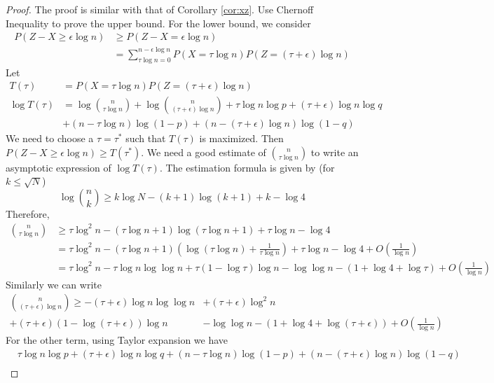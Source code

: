 \documentclass{article}
\begin{document}
\begin{proof}
	The proof is similar with that of Corollary \ref{cor:xz}.
	Use Chernoff Inequality to prove the upper bound. For the lower bound, we consider
	\begin{align*}
	P(Z - X \geq \epsilon \log n) & \geq P(Z - X = \epsilon \log n) \\
	& = \sum_{\tau \log n = 0}^{n - \epsilon \log n} P(X = \tau \log n) P(Z = (\tau + \epsilon) \log n)
	\end{align*}
	Let
	\begin{align*}
	T(\tau) &= P(X = \tau \log n) P(Z = (\tau + \epsilon) \log n) \\ 
	\log T(\tau) & = \log \binom{n}{\tau \log n} +  \log \binom{n}{(\tau + \epsilon) \log n}
    +  \tau \log n \log p + (\tau + \epsilon) \log n \log q \\
    &+ (n - \tau \log n) \log (1 - p)
    + (n - (\tau + \epsilon) \log n ) \log (1 - q )
	\end{align*}
	We need to choose a $\tau=\tau^*$ such that $T(\tau)$ is maximized. Then
	$ P(Z - X \geq \epsilon \log n) \geq T(\tau^*)$.
	We need a good estimate of $\binom{n}{\tau \log n}$ to write an asymptotic expression of $\log T(\tau)$.
	The estimation formula is given by (for $k\leq \sqrt{N}$)
	$$
	\log \binom{n}{k} \geq k \log N - (k+1) \log (k+1) + k - \log 4
	$$
	Therefore,
	\begin{align*}
	\binom{n}{\tau \log n} &\geq \tau \log^2 n - (\tau \log n + 1)\log(\tau \log n + 1) + \tau \log n  - \log 4 \\
	&=  \tau \log^2 n - (\tau \log n + 1)(\log(\tau \log n) + \frac{1}{\tau \log n}) + \tau \log n  - \log 4 + O(\frac{1}{\log n}) \\
	& = \tau \log^2 n - \tau \log n\log\log n + \tau (  1 - \log \tau)\log n - \log\log n- (1 + \log 4 + \log \tau)  + O(\frac{1}{\log n}) 
	\end{align*}
	Similarly we can write
	\begin{align*}
	\binom{n}{(\tau + \epsilon) \log n} \geq -(\tau + \epsilon) \log n\log\log n & +(\tau + \epsilon) \log^2 n\\
	+ (\tau + \epsilon) (1-\log (\tau + \epsilon) )\log n &- \log\log n - (1 + \log 4 + \log (\tau+\epsilon))  + O(\frac{1}{\log n}) 
	\end{align*}
	For the other term, using Taylor expansion we have
	\begin{align*}
	& \tau \log n \log p + (\tau + \epsilon) \log n \log q 
    + (n - \tau \log n) \log (1 - p)
    + (n - (\tau + \epsilon) \log n ) \log (1 - q ) \\

\end{align*}
\end{proof}
\end{document}
